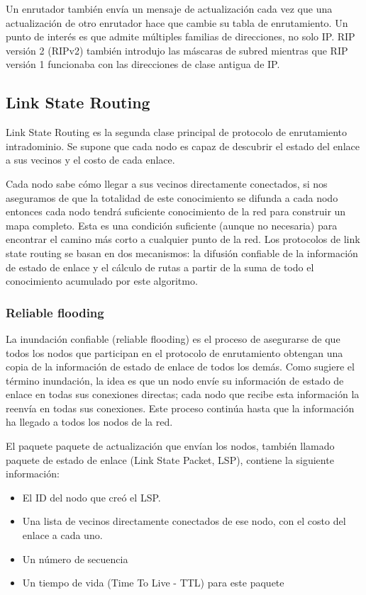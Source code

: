 Un enrutador también envía un mensaje de actualización cada vez que una actualización de otro enrutador hace que cambie su tabla de enrutamiento. Un punto de interés es que admite múltiples familias de direcciones, no solo IP. RIP versión 2 (RIPv2) también introdujo las máscaras de subred mientras que RIP versión 1 funcionaba con las direcciones de clase antigua de IP.

\subsection{Link State Routing}
Link State Routing es la segunda clase principal de protocolo de enrutamiento intradominio. Se supone que cada nodo es capaz de descubrir el estado del enlace a sus vecinos y el costo de cada enlace.

Cada nodo sabe cómo llegar a sus vecinos directamente conectados, si nos aseguramos de que la totalidad de este conocimiento se difunda a cada nodo entonces cada nodo tendrá suficiente conocimiento de la red para construir un mapa completo. Esta es una condición suficiente (aunque no necesaria) para encontrar el camino más corto a cualquier punto de la red. Los protocolos de link state routing se basan en dos mecanismos: la difusión confiable de la información de estado de enlace y el cálculo de rutas a partir de la suma de todo el conocimiento acumulado por este algoritmo.

\subsubsection{Reliable flooding}
La inundación confiable (reliable flooding) es el proceso de asegurarse de que todos los nodos que participan en el protocolo de enrutamiento obtengan una copia de la información de estado de enlace de todos los demás. Como sugiere el término inundación, la idea es que un nodo envíe su información de estado de enlace en todas sus conexiones directas; cada nodo que recibe esta información la reenvía en todas sus conexiones. Este proceso continúa hasta que la información ha llegado a todos los nodos de la red.

El paquete paquete de actualización que envían los nodos, también llamado paquete de estado de enlace (Link State Packet, LSP), contiene la siguiente información:

\begin{itemize}
  \item El ID del nodo que creó el LSP.
  \item Una lista de vecinos directamente conectados de ese nodo, con el costo del enlace a cada uno.
  \item Un número de secuencia
  \item Un tiempo de vida (Time To Live - TTL) para este paquete
\end{itemize}

